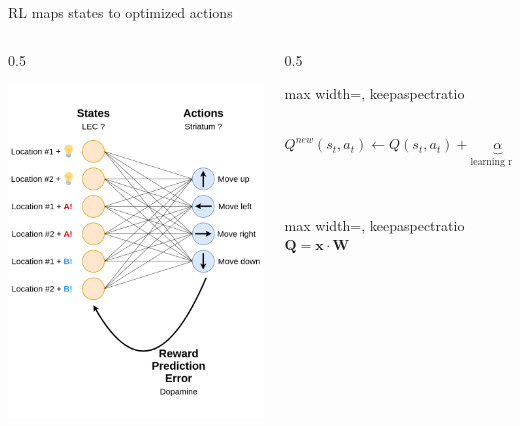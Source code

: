 \documentclass[bigger]{beamer}
\begin{document}
\begin{frame}[label={sec:orgb973b7f}]{RL maps states to optimized actions}
\begin{columns}
\begin{column}{0.5\columnwidth}
\begin{center}
\includegraphics[height=0.8\textheight]{./img/RL_mapping.drawio.png}
\end{center}
\end{column}
\begin{column}{0.5\columnwidth}
\begin{adjustbox}{max width=\columnwidth, keepaspectratio}
\( Q^{new}(s_t, a_t) \longleftarrow Q(s_t, a_t) + \underbrace{\alpha}_\text{learning rate}\overbrace{(\underbrace{r_t}_\text{reward} + \gamma \operatorname*{max}_a Q(s_{t+1, a}) - Q(s_t, a_t))}^\text{temporal difference} \)
\end{adjustbox}\\[1em]
\begin{adjustbox}{max width=\columnwidth, keepaspectratio}
\( \mathbf{Q} = \mathrm{\mathbf{x}} \cdot \mathbf{W} \)
\end{adjustbox}
\end{column}
\end{columns}
\end{frame}
\end{document}
